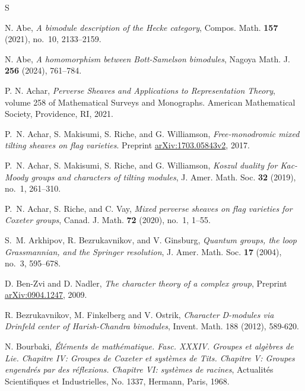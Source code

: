 \documentclass{amsart}
\theoremstyle{definition}
\numberwithin{equation}{subsection}
\begin{document}
    \begin{thebibliography}{S}

        N. Abe, \emph{A bimodule description of the Hecke category}, Compos. Math. {\bf 157} (2021), no.~10, 2133--2159.

        N. Abe, \emph{A homomorphism between Bott-Samelson bimodules}, Nagoya Math. J. {\bf 256} (2024), 761--784.

        P. N. Achar, \emph{Perverse Sheaves and Applications to Representation Theory}, volume 258 of Mathematical Surveys and Monographs. American Mathematical Society, Providence, RI, 2021.

        P.~N. Achar, S. Makisumi, S. Riche, and G. Williamson, \emph{Free-monodromic mixed tilting sheaves on flag varieties}. Preprint \href{http://arxiv.org/abs/1703.05843v2}{arXiv:1703.05843v2}, 2017.

        P.~N. Achar, S. Makisumi, S. Riche, and G. Williamson, \emph{Koszul duality for Kac-Moody groups and characters of tilting modules}, J. Amer. Math. Soc. {\bf 32} (2019), no.~1, 261--310.

        P.~N. Achar, S. Riche, and C. Vay, \emph{Mixed perverse sheaves on flag varieties for Coxeter groups}, Canad. J. Math. {\bf 72} (2020), no.~1, 1--55.

        S.~M. Arkhipov, R. Bezrukavnikov, and V. Ginsburg, \emph{Quantum groups, the loop Grassmannian, and the Springer resolution}, J. Amer. Math. Soc. {\bf 17} (2004), no.~3, 595--678.

        D. Ben-Zvi and D. Nadler, \emph{The character theory of a complex group}, Preprint \href{http://arxiv.org/abs/0904.1247}{arXiv:0904.1247}, 2009.

        R. Bezrukavnikov, M. Finkelberg and V. Ostrik, \emph{Character D-modules via Drinfeld center of Harish-Chandra bimodules}, Invent. Math. 188 (2012), 589-620.

        N. Bourbaki, {\it \'El\'ements de math\'ematique. Fasc. XXXIV. Groupes et alg\`ebres de Lie. Chapitre IV: Groupes de Coxeter et syst\`emes de Tits. Chapitre V: Groupes engendr\'es par des r\'eflexions. Chapitre VI: syst\`emes de racines}, Actualit\'es Scientifiques et Industrielles, No. 1337, Hermann, Paris, 1968.


\end{thebibliography}
\end{document}
